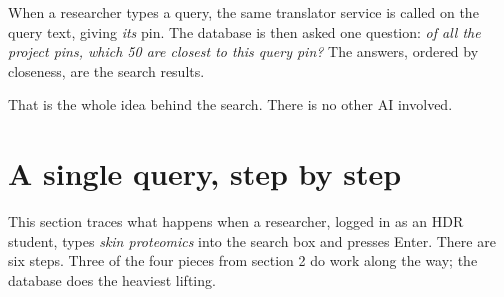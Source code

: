 \documentclass[11pt,a4paper]{article}
\begin{document}
When a researcher types a query, the same translator service is called on the query text, giving \emph{its} pin. The database is then asked one question: \emph{of all the project pins, which 50 are closest to this query pin?} The answers, ordered by closeness, are the search results.

That is the whole idea behind the search. There is no other AI involved.

\section{A single query, step by step}

This section traces what happens when a researcher, logged in as an HDR student, types \emph{skin proteomics} into the search box and presses Enter. There are six steps. Three of the four pieces from section 2 do work along the way; the database does the heaviest lifting.
\end{document}
